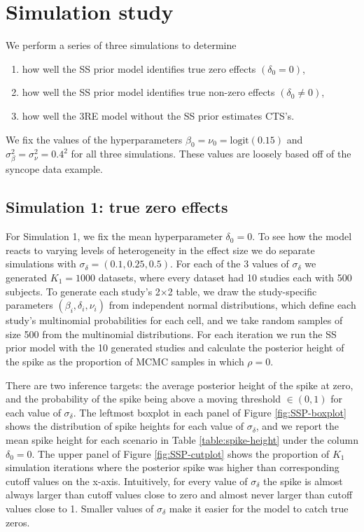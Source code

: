 \documentclass[AMA,STIX1COL]{WileyNJD-v2}
\begin{document}
\section{Simulation study} \label{sec:simulation}

We perform a series of three simulations to determine 
\begin{enumerate}
\item{how well the SS prior model identifies true zero effects $(\delta_0 = 0)$,}
\item{how well the SS prior model identifies true non-zero effects $(\delta_0 \ne 0)$,}
\item{how well the 3RE model without the SS prior estimates CTS's.}
\end{enumerate}
\noindent We fix the values of the hyperparameters $\beta_0 = \nu_0 = \mbox{logit}(0.15)$ and $\sigma_\beta^2 = \sigma_\nu^2 = 0.4^2$ for all three simulations. These values are loosely based off of the syncope data example. 

\subsection{Simulation 1: true zero effects} \label{sec:sim_zero}

For Simulation 1, we fix the mean hyperparameter $\delta_0 = 0$. To see how the model reacts to varying levels of heterogeneity in the effect size we do separate simulations with $\sigma_\delta = (0.1, 0.25, 0.5)$. For each of the 3 values of $\sigma_\delta$ we generated $K_1 = 1000$ datasets, where every dataset had 10 studies each with 500 subjects. To generate each study's 2$\times$2 table, we draw the study-specific parameters $(\beta_i, \delta_i, \nu_i)$ from independent normal distributions, which define each study's multinomial probabilities for each cell, and we take random samples of size 500 from the multinomial distributions. For each iteration we run the SS prior model with the 10 generated studies and calculate the posterior height of the spike as the proportion of MCMC samples in which $\rho = 0$. 

There are two inference targets: the average posterior height of the spike at zero, and the probability of the spike being above a moving threshold $\in (0, 1)$ for each value of $\sigma_\delta$. The leftmost boxplot in each panel of Figure \ref{fig:SSP-boxplot} shows the distribution of spike heights for each value of $\sigma_\delta$, and we report the mean spike height for each scenario in Table \ref{table:spike-height} under the column $\delta_0 = 0$. The upper panel of Figure \ref{fig:SSP-cutplot} shows the proportion of $K_1$ simulation iterations where the posterior spike was higher than corresponding cutoff values on the x-axis. Intuitively, for every value of $\sigma_\delta$ the spike is almost always larger than cutoff values close to zero and almost never larger than cutoff values close to 1. Smaller values of $\sigma_\delta$ make it easier for the model to catch true zeros. 
\end{document}
